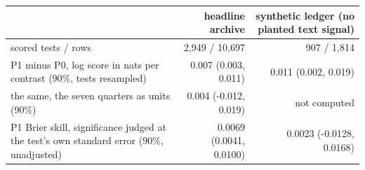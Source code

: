 \begin{tabular}{lrr}
\toprule
 & headline archive & synthetic ledger (no planted text signal) \\
\midrule
scored tests / rows & 2,949 / 10,697 & 907 / 1,814 \\
P1 minus P0, log score in nats per contrast (90\%, tests resampled) & 0.007 (0.003, 0.011) & 0.011 (0.002, 0.019) \\
the same, the seven quarters as units (90\%) & 0.004 (-0.012, 0.019) & not computed \\
P1 Brier skill, significance judged at the test's own standard error (90\%, unadjusted) & 0.0069 (0.0041, 0.0100) & 0.0023 (-0.0128, 0.0168) \\

\end{tabular}
